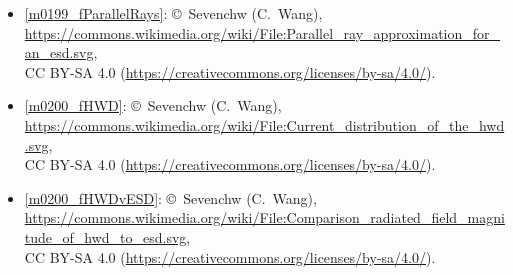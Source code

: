 \begin{itemize}
\item[Fig.] \label{m0199_fParallelRays_Credit}
  \ref{m0199_fParallelRays}:
  \copyright~Sevenchw (C.\ Wang), 
  \url{https://commons.wikimedia.org/wiki/File:Parallel_ray_approximation_for_an_esd.svg},\\ 
  CC BY-SA 4.0 (\url{https://creativecommons.org/licenses/by-sa/4.0/}).

\item[Fig.] \label{m0200_fHWD_Credit}
  \ref{m0200_fHWD}:
  \copyright~Sevenchw (C.\ Wang), 
  \url{https://commons.wikimedia.org/wiki/File:Current_distribution_of_the_hwd.svg},\\ 
  CC BY-SA 4.0 (\url{https://creativecommons.org/licenses/by-sa/4.0/}).

\item[Fig.] \label{m0200_fHWDvESD_Credit}
  \ref{m0200_fHWDvESD}:
  \copyright~Sevenchw (C.\ Wang), 
  \url{https://commons.wikimedia.org/wiki/File:Comparison_radiated_field_magnitude_of_hwd_to_esd.svg},\\ 
  CC BY-SA 4.0 (\url{https://creativecommons.org/licenses/by-sa/4.0/}).

\end{itemize}

\twocolumn
